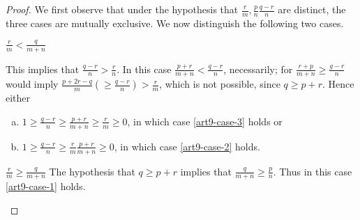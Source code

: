 \begin{proof}
We first observe that under the hypothesis that $\frac{r}{m}, \frac{p}{n} \frac{q-r}{n}$ are distinct, the three cases are mutually exclusive. We now distinguish the following two cases. 

\setcounter{case}{0}
\begin{case}\label{art9-case-1}
$\frac{r}{m} < \frac{q}{m+n}$

\noindent
This implies that $\frac{q-r}{n} > \frac{r}{n}$. In this case $\frac{p+r}{m+n} < \frac{q-r}{n}$, necessarily; for $\frac{r+p}{m+n} \geq \frac{g-r}{n}$ would imply $\frac{p+2r-q}{m}(\geq \frac{q-r}{n}) > \frac{r}{m}$, which is not possible, since $q \geq p +r$. Hence either
\begin{enumerate}[(a)]
 \item $1 \geq \frac{q-r}{n} \geq \frac{p+r}{m+n} \geq \frac{r}{m} \geq 0$, in which case \eqref{art9-case-3}
 holds or\label{art9-case-1-enum-a}
 \item $ 1 \geq \frac{q-r}{n} \geq \frac{r}{m} \frac{p+r}{m+n} \geq 0$, in which case \eqref{art9-case-2}
 holds.\label{art9-case-1-enum-b}
\end{enumerate}
\end{case}

\begin{case}\label{art9-case-2}
$\frac{r}{m}\geq \frac{q}{m+n}$  The hypothesis that $q\geq p + r$ implies that $ \frac{q}{m+n} \geq \frac{p}{n}$.
Thus in this case \eqref{art9-case-1} holds.
\end{case}
\end{proof}

\setcounter{subsection}{1}
